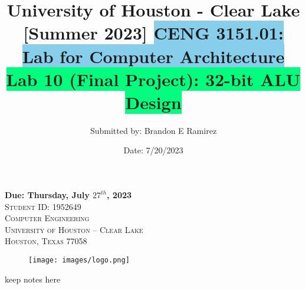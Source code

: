 \documentclass[notitlepage,a4paper,oneside,article,table]{article}
\title {University of Houston - Clear Lake [Summer 2023] \vspace{0.005cm}
\colorbox{SkyBlue}{CENG 3151.01: Lab for Computer Architecture} \\ \vspace{0.65cm}
\colorbox{SpringGreen}{Lab 10 (Final Project): 32-bit ALU Design}}
\author{Submitted by: Brandon E Ramirez}
\date{Date: 7/20/2023}
\begin{document}
\pagestyle{fancy}

\fancyhead{}\fancyfoot{}





\maketitle

\begin{center}
       \textbf{Due: Thursday, July $27^{th}$, 2023}\\
       \textsc{Student ID: 1952649}
       \vspace{0.2cm}\\
       
       \textsc{Computer Engineering\\
University of Houston – Clear Lake\\
Houston, Texas 77058}\\


\begin{figure}[h] %
    \centering
    \texttt{[image: images/logo.png]}
\end{figure}
\FloatBarrier
   \end{center}
\doublespacing

       \newpage %


\vspace{1cm}

\newpage
\small \tableofcontents
\small \listoffigures
\small \lstlistoflistings


\vspace{0.25cm}

\iffalse
keep notes here
\end{document}
